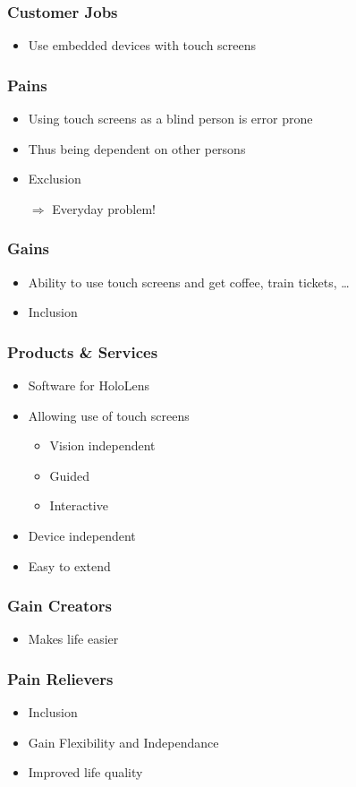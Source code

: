 \begin{frame}
	\frametitle{Customer Jobs}
	\begin{itemize}
		\item
			Use embedded devices with touch screens
	\end{itemize}
\end{frame}


\begin{frame}
	\frametitle{Pains}
	\begin{itemize}
		\item
			Using touch screens as a blind person is error prone
		\item
			Thus being dependent on other persons
		\item
			Exclusion
	\end{itemize}
	\vfill
	\begin{itemize}
		\item[$\Rightarrow$]
			Everyday problem!
	\end{itemize}
\end{frame}

\begin{frame}
	\frametitle{Gains}
	\begin{itemize}
		\item
			Ability to use touch screens and get coffee, train tickets, \dots
		\item
			Inclusion
	\end{itemize}
\end{frame}

\begin{frame}
	\frametitle{Products \& Services}
	\begin{itemize}
		\item
			Software for HoloLens
		\item
			Allowing use of touch screens
			\begin{itemize}
				\item
					Vision independent
				\item
					Guided
				\item
					Interactive
			\end{itemize}
		\item
			Device independent
		\item
			Easy to extend
	\end{itemize}
\end{frame}

\begin{frame}
	\frametitle{Gain Creators}
	\begin{itemize}
		\item
			Makes life easier
	\end{itemize}
\end{frame}

\begin{frame}
	\frametitle{Pain Relievers}
	\begin{itemize}
		\item
			Inclusion
		\item
			Gain Flexibility and Independance
		\item
			Improved life quality
	\end{itemize}
\end{frame}






